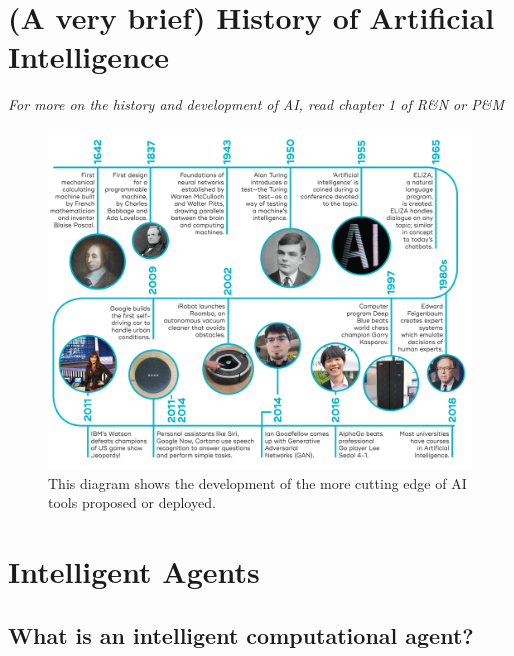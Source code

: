 \documentclass[12pt]{article}
\begin{document}
\newpage
\section{(A very brief) History of Artificial Intelligence}

\emph{For more on the history and development of AI, read chapter 1 of R\&N or P\&M}

\begin{figure}[h!]
        \centering
        \includegraphics{ai-timeline.jpg}
        \caption{This diagram shows the development of the more cutting edge of AI tools proposed or deployed.}
        \label{fig:my_label}
\end{figure}

\newpage
\section{Intelligent Agents}

\subsection{What is an intelligent computational agent?}
\end{document}
